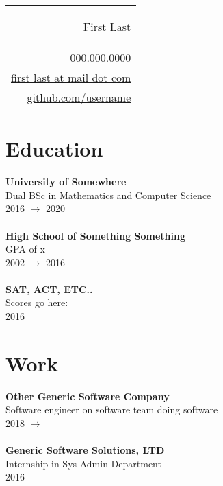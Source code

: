 \documentclass[a4paper,10pt]{article}
\def \name{First Last}
\def \phone{000.000.0000}
\def \email{first last at mail dot com}
\def \site{github.com/username}
\begin{document}
\begin{flushright}
\begin{tabular}{r |}
\begin{Large} \sffamily\color{MidnightBlue} \name  \end{Large}
\bigskip \\
\phone \\
\href{mailto: \email}{\email} \\
\href{https://\site}{\site}
\end{tabular}
\end{flushright}


\section{Education}
\textbf{University of Somewhere}\\
Dual BSc in Mathematics and Computer Science\\
2016 $\to$ 2020 \\
\\
\textbf{High School of Something Something}\\
GPA of x \\
2002 $\to$ 2016\\
\\
\textbf{SAT, ACT, ETC..} \\
Scores go here:\\
2016

\section{Work}
\textbf{Other Generic Software Company} \\
Software engineer on software team doing software \\
2018 $\to$ \the\year{} \\ %
\\
\textbf{Generic Software Solutions, LTD} \\
Internship in Sys Admin Department\\
2016\\
\end{document}

